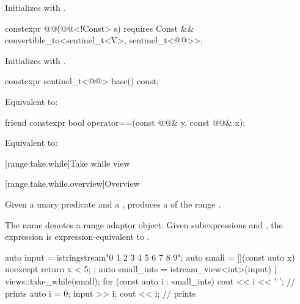 \begin{itemdescr}
\pnum
\effects
Initializes  with .
\end{itemdescr}

%
\begin{itemdecl}
constexpr @@(@@<!Const> s)
  requires Const && convertible_to<sentinel_t<V>, sentinel_t<@@>>;
\end{itemdecl}

\begin{itemdescr}
\pnum
\effects
Initializes  with .
\end{itemdescr}

%
\begin{itemdecl}
constexpr sentinel_t<@@> base() const;
\end{itemdecl}

\begin{itemdescr}
\pnum
\effects
Equivalent to: 
\end{itemdescr}

%
\begin{itemdecl}
friend constexpr bool operator==(const @@& y, const @@& x);
\end{itemdecl}

\begin{itemdescr}
\pnum
\effects
Equivalent to:
\end{itemdescr}

[range.take.while]{Take while view}

[range.take.while.overview]{Overview}

\pnum
Given a unary predicate  and a  ,
 produces a 
of the range .

%
\pnum
The name  denotes
a range adaptor object.
Given subexpressions  and ,
the expression 
is expression-equivalent to .

\pnum
\begin{example}
\begin{codeblock}
auto input = istringstream{"0 1 2 3 4 5 6 7 8 9"};
auto small = [](const auto x) noexcept { return x < 5; };
auto small_ints = istream_view<int>(input) | views::take_while(small);
for (const auto i : small_ints) {
  cout << i << ' ';                             // prints 
}
auto i = 0;
input >> i;
cout << i;                                      // prints 
\end{codeblock}
\end{example}

